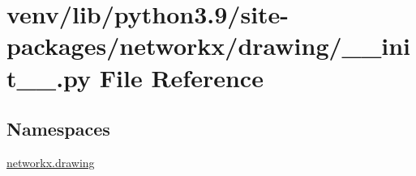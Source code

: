\hypertarget{venv_2lib_2python3_89_2site-packages_2networkx_2drawing_2____init_____8py}{}\section{venv/lib/python3.9/site-\/packages/networkx/drawing/\+\_\+\+\_\+init\+\_\+\+\_\+.py File Reference}
\label{venv_2lib_2python3_89_2site-packages_2networkx_2drawing_2____init_____8py}
\subsection*{Namespaces}
\begin{DoxyCompactItemize}
\item 
 \hyperlink{namespacenetworkx_1_1drawing}{networkx.\+drawing}
\end{DoxyCompactItemize}

